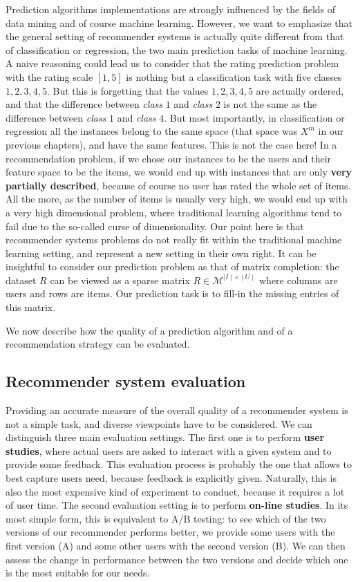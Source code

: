 Prediction algorithms implementations are strongly influenced by the fields of
data mining and of course machine learning. However, we want to emphasize that
the general setting of recommender systems is actually quite different from
that of classification or regression, the two main prediction tasks of machine
learning. A naive reasoning could lead us to consider that the rating
prediction problem with the rating scale $[1, 5]$ is nothing but a
classification task with five classes $1, 2, 3, 4, 5$. But this is forgetting
that the values $1, 2, 3, 4, 5$ are actually ordered, and that the difference
between \textit{class} $1$ and \textit{class} $2$ is not the same as the
difference between \textit{class} $1$ and \textit{class} $4$. But most
importantly, in classification or regression all the instances belong to the
same space (that space was $X^m$ in our previous chapters), and have the same
features. This is not the case here! In a recommendation problem, if we chose
our instances to be the users and their feature space to be the items, we would
end up with instances that are only \textbf{very partially described}, because of
course no user has rated the whole set of items. All the more, as the number of
items is usually very high, we would end up with a very high dimensional
problem, where traditional learning algorithms tend to fail due to the
so-called curse of dimensionality. Our point here is that recommender systems
problems do not really fit within the traditional machine learning setting, and
represent a new setting in their own right. It can be insightful to consider
our  prediction problem as that of matrix completion: the dataset $R$ can be
viewed as a sparse matrix $R \in \mathcal{M}^{\mid I \mid \times \mid U \mid}$ where columns are users and rows are items. Our
prediction task  is to fill-in the missing entries of this matrix.

We now describe how the quality of a prediction algorithm and of a
recommendation strategy can be evaluated.

\subsection{Recommender system evaluation}
\label{SEC:Recommender_system_evaluation}
Providing an accurate measure of the overall quality of a recommender system is
not a simple task, and diverse viewpoints have to be considered.
We can distinguish three main evaluation settings. The first one is to perform
\textbf{user studies}, where actual users are asked to interact with a given system and to
provide some feedback. This evaluation process is probably the one that allows
to best capture users need, because feedback is explicitly given. Naturally,
this is also the most expensive kind of experiment to conduct, because it
requires a lot of user time. The second evaluation setting is to perform
\textbf{on-line
studies}. In its most simple form, this is equivalent to A/B testing: to see
which of the two versions of our recommender performs better, we provide some
users with the first version (A) and some other users with the second version
(B). We
can then assess the change in performance between the two versions and decide
which one is the most suitable for our needs.

